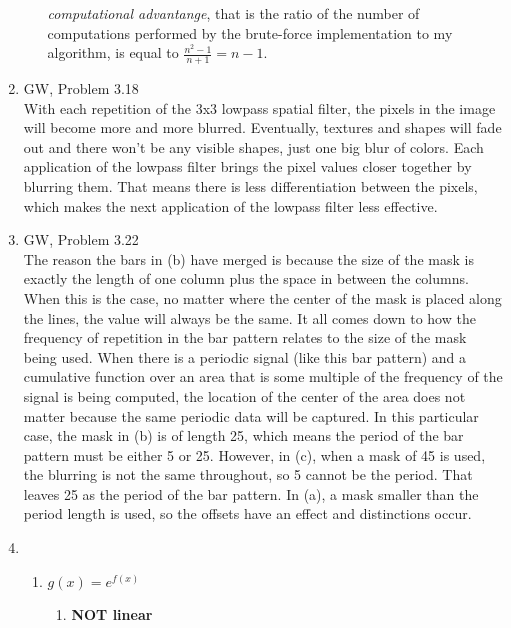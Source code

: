 \documentclass[9pt]{article}
\begin{document}
\begin{enumerate}
\begin{enumerate}
          \textit{computational advantange}, that is the ratio of the number of
          computations performed by the brute-force implementation to my
          algorithm, is equal to $ \displaystyle \frac{n^{2} - 1}{n + 1}
          = n - 1 $. \\
      \end{enumerate}
    \item
      GW, Problem 3.18 \\
      With each repetition of the 3x3 lowpass spatial filter, the pixels in the
      image will become more and more blurred. Eventually, textures and shapes
      will fade out and there won't be any visible shapes, just one big blur of
      colors. Each application of the lowpass filter brings the pixel values
      closer together by blurring them. That means there is less
      differentiation between the pixels, which makes the next application of
      the lowpass filter less effective. \\
    \item
      GW, Problem 3.22 \\
      The reason the bars in (b) have merged is because the size of the mask is
      exactly the length of one column plus the space in between the columns.
      When this is the case, no matter where the center of the mask is placed
      along the lines, the value will always be the same. It all comes down to
      how the frequency of repetition in the bar pattern relates to the size of
      the mask being used. When there is a periodic signal (like this bar
      pattern) and a cumulative function over an area that is some multiple of
      the frequency of the signal is being computed, the location of the center
      of the area does not matter because the same periodic data will be
      captured. In this particular case, the mask in (b) is of length 25, which
      means the period of the bar pattern must be either 5 or 25. However, in
      (c), when a mask of 45 is used, the blurring is not the same throughout,
      so 5 cannot be the period. That leaves 25 as the period of the bar
      pattern. In (a), a mask smaller than the period length is used, so the
      offsets have an effect and distinctions occur.
    \item
      \begin{enumerate}
        \item
          $ g(x) = e^{f(x)} $
          \begin{enumerate}
          \item
            \textbf{NOT linear}

\end{enumerate}
\end{enumerate}
\end{enumerate}
\end{document}
